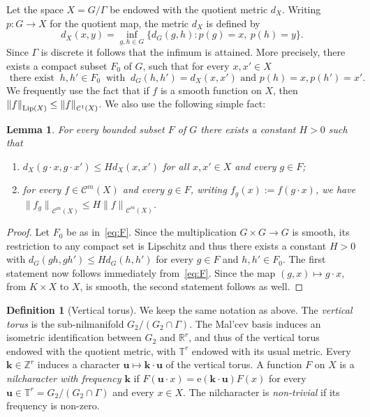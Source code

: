 \documentclass[11pt]{amsart}
\newtheorem{lemma}{Lemma}[section]
\theoremstyle{definition}
\newtheorem*{definition}{Definition}
\begin{document}
Let the space $X=G/\Gamma$ be endowed with the quotient metric
$d_X$. Writing $p\colon G\to X$ for the quotient map, the metric
$d_X$ is defined by
$$
d_X(x,y)=\inf_{g,h\in G}\{d_G(g,h)\colon p(g)=x,\ p(h)=y\}.
$$
Since  $\Gamma$ is discrete it follows that the infimum
is attained. More precisely, there exists a compact subset $F_0$ of
$G$, such that for every   $x,x'\in X$
\begin{equation}
\label{eq:F} \text{ there exist }\ h,h'\in
F_0\ \text{ with }\ d_G(h,h')=d_X(x,x') \text{ and } p(h)=x, p(h')=x'.
\end{equation}
We frequently  use
the fact that if $f$ is a smooth function on $X$, then ${\lVert f \rVert}_{{{\text{\rm Lip}}}(X)}\leq{\lVert f \rVert}_{{{\mathcal C}}^1(X)}$. We also use  the following simple fact:
\begin{lemma}
\label{lemp:ap1} For every bounded subset $F$ of $G$ there exists
a constant $H>0$ such that
\begin{enumerate}
\item
$d_X(g\cdot x,g\cdot x')\leq Hd_X(x,x')$ for all $x,x'\in X$ and
every $g\in F$;
\item
  for   every  $f\in{{\mathcal C}}^m(X)$ and every $g\in F$,
writing $f_g(x):=f(g\cdot x)$, we have ${\lVert {f_g} \rVert}_{{{\mathcal C}}^m(X)}\leq
H{\lVert f \rVert}_{{{\mathcal C}}^m(X)}$.
\end{enumerate}
\end{lemma}
\begin{proof}
Let $F_0$ be as in~\eqref{eq:F}. Since the multiplication $G\times
G\to G$ is smooth, its restriction to any compact set is Lipschitz
and thus there exists  a constant $H>0$ with $d_G(gh,gh')\leq
Hd_G(h,h')$ for every $g\in F$ and  $h,h'\in F_0$. The first
statement now follows immediately from~\eqref{eq:F}. Since
 the map $(g,x)\mapsto g\cdot x$, from $
K\times X$ to $X$, is smooth, the second statement follows as well.
\end{proof}

\begin{definition}[Vertical torus]
  We keep the same notation as above.
 The \emph{vertical torus} is the
sub-nilmanifold  $G_2/(G_2\cap\Gamma)$. The Mal'cev basis induces an
isometric identification between $G_2$ and ${{\mathbb R}}^r$, and thus of the
vertical torus endowed with the quotient metric, with ${{\mathbb T}}^r$ endowed
with its usual metric. Every ${{\mathbf{k}}}\in{{\mathbb Z}}^r$ induces a character
${{\mathbf{u}}}\mapsto {{\mathbf{k}}}\cdot {{\mathbf{u}}}$ of the vertical torus. A function $F$ on
$X$ is a    \emph{nilcharacter with frequency ${{\mathbf{k}}}$} if $F({{\mathbf{u}}}\cdot
x)={\mathrm{e}}({{\mathbf{k}}}\cdot{{\mathbf{u}}})F(x)$ for every ${{\mathbf{u}}}\in {{\mathbb T}}^r=G_2/(G_2\cap \Gamma)$ and
every $x\in X$. The nilcharacter is \emph{non-trivial} if its
frequency is non-zero.
\end{definition}
\end{document}
